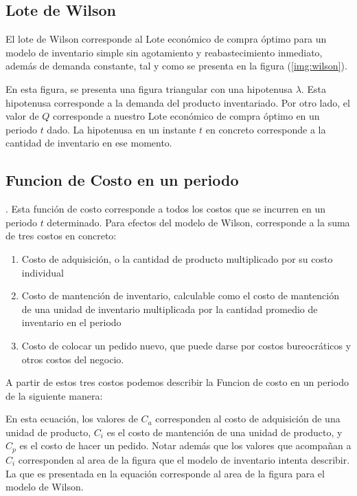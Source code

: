 \subsection{Lote de Wilson}
El lote de Wilson corresponde al Lote económico de compra óptimo para un modelo de inventario simple sin agotamiento y reabastecimiento inmediato, además de demanda constante, tal y como se presenta en la figura (\ref{img:wilson}).

En esta figura, se presenta una figura triangular con una hipotenusa $\lambda$. Esta hipotenusa corresponde a la demanda del producto inventariado. Por otro lado, el valor de $Q$ corresponde a nuestro Lote económico de compra óptimo en un periodo $t$ dado. La hipotenusa en un instante $t$ en concreto corresponde a la cantidad de inventario en ese momento.

\subsection{Funcion de Costo en un periodo}.
Esta función de costo corresponde a todos los costos que se incurren en un periodo $t$ determinado. Para efectos del modelo de Wilson, corresponde a la suma de tres costos en concreto:

\begin{enumerate}
    \item Costo de adquisición, o la cantidad de producto multiplicado por su costo individual
    \item Costo de mantención de inventario, calculable como el costo de mantención de una unidad de inventario multiplicada por la cantidad promedio de inventario en el periodo
    \item Costo de colocar un pedido nuevo, que puede darse por costos bureocráticos y otros costos del negocio.
\end{enumerate}

A partir de estos tres costos podemos describir la Funcion de costo en un periodo de la siguiente manera:


En esta ecuación, los valores de $C_a$ corresponden al costo de adquisición de una unidad de producto, $C_i$ es el costo de mantención de una unidad de producto, y $C_p$ es el costo de hacer un pedido. Notar además que los valores que acompañan a $C_i$ corresponden al area de la figura que el modelo de inventario intenta describir. La que es presentada en la equación  corresponde al area de la figura para el modelo de Wilson.

